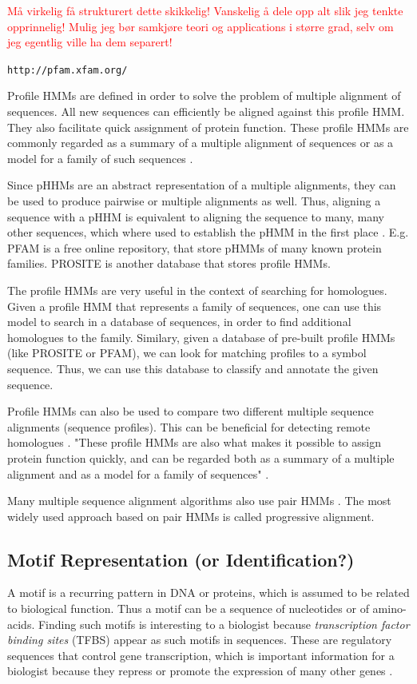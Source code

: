 \documentclass{article}
\begin{document}
\textcolor{red}{Må virkelig få strukturert dette skikkelig! Vanskelig å dele opp alt slik jeg tenkte opprinnelig! Mulig jeg bør samkjøre teori og applications i større grad, selv om jeg egentlig ville ha dem separert!}

\verb$http://pfam.xfam.org/$

Profile HMMs are defined in order to solve the problem of multiple alignment of sequences. All new sequences can efficiently be aligned against this profile HMM. They also facilitate quick assignment of protein function. These profile HMMs are commonly regarded as a summary of a multiple alignment of sequences or as a model for a family of such sequences \cite{Christianini2006}. 

Since pHHMs are an abstract representation of a multiple alignments, they can be used to produce pairwise or multiple alignments as well. Thus, aligning a sequence with a pHHM is equivalent to aligning the sequence to many, many other sequences, which where used to establish the pHMM in the first place \cite{Christianini2006}. E.g. PFAM is a free online repository, that store pHMMs of many known protein families. PROSITE is another database that stores profile HMMs. 

The profile HMMs are very useful in the context of searching for homologues. Given a profile HMM that represents a family of sequences, one can use this model to search in a database of sequences, in order to find additional homologues to the family. Similary, given a database of pre-built profile HMMs (like PROSITE or PFAM), we can look for matching profiles to a symbol sequence. Thus, we can use this database to classify and annotate the given sequence. 

Profile HMMs can also be used to compare two different multiple sequence alignments (sequence profiles). This can be beneficial for detecting remote homologues \cite{Yoon2009}. "These proﬁle HMMs are also what makes it possible to assign protein function quickly, and can be regarded both as a summary of a multiple alignment and as a model for a family of sequences" \cite{Christianini2006}.

Many multiple sequence alignment algorithms also use pair HMMs \cite{Yoon2009}. The most widely used approach based on pair HMMs is called progressive alignment. 

\subsection{Motif Representation (or Identification?)}
A motif is a recurring pattern in DNA or proteins, which is assumed to be related to biological function. Thus a motif can be a sequence of nucleotides or of amino-acids. Finding such motifs is interesting to a biologist because \textit{transcription factor binding sites} (TFBS) appear as such motifs in sequences. These are regulatory sequences that control gene transcription, which is important information for a biologist because they repress or promote the expression of many other genes \cite{Christianini2006}.
\end{document}
